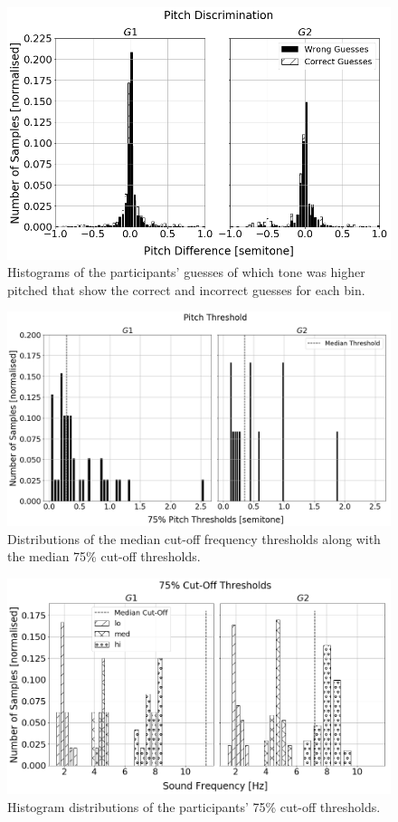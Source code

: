 \documentclass[acmsmall]{acmart}
\begin{document}
\begin{figure}
  \centering
  \includegraphics[width=0.8\columnwidth]{figures/pitch_discrimination.png}
  \caption{Histograms of the participants' guesses of which tone was higher pitched that show the correct and incorrect guesses for each bin. }\label{fig:pitch-discrimination}
\end{figure}

\begin{figure}
  \centering
  \includegraphics[width=0.8\columnwidth]{figures/pitch_thresholds.png}
  \caption{Distributions of the median cut-off frequency thresholds along with the median 75\% cut-off thresholds. }\label{fig:pitch-thresholds}
\end{figure}

\begin{figure}
  \centering
  \includegraphics[width=0.8\columnwidth]{figures/pitch_thresholds_limits.png}
  \caption{Histogram distributions of the participants' 75\% cut-off thresholds. }\label{fig:pitch-thresholds-hist}
\end{figure}
\end{document}
